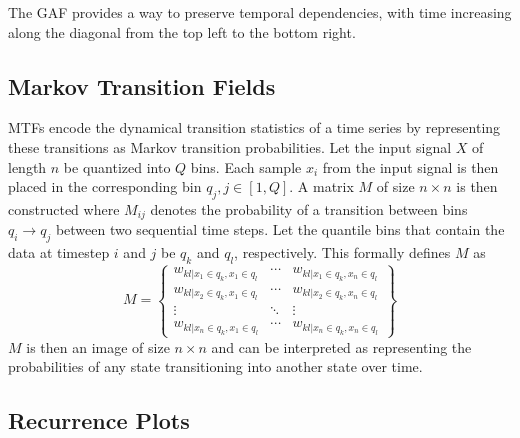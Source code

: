 The GAF provides a way to preserve temporal dependencies, with time increasing along the diagonal from the top left to the bottom right.

\subsection{Markov Transition Fields}

MTFs \cite{wang2015imaging} encode the dynamical transition statistics of a time series by representing these transitions as Markov transition probabilities.
Let the input signal $X$ of length $n$ be quantized into $Q$ bins.
Each sample $x_i$ from the input signal is then placed in the corresponding bin $q_j, j \in [1, Q]$.
A matrix $M$ of size $n \times n$ is then constructed where $M_{ij}$ denotes the probability of a transition between bins $q_i \rightarrow q_j$ between two sequential time steps. 
Let the quantile bins that contain the data at timestep $i$ and $j$ be $q_k$ and $q_l$, respectively.
This formally defines $M$ as
\begin{equation}
	M = \begin{Bmatrix}
			w_{kl|x_1 \in q_k, x_1 \in q_l} & \cdots & w_{kl|x_1 \in q_k, x_n \in q_l} \\
			w_{kl|x_2 \in q_k, x_1 \in q_l} & \cdots & w_{kl|x_2 \in q_k, x_n \in q_l} \\
			\vdots                          & \ddots & \vdots                          \\
			w_{kl|x_n \in q_k, x_1 \in q_l} & \cdots & w_{kl|x_n \in q_k, x_n \in q_l}
		\end{Bmatrix}
\end{equation}
$M$ is then an image of size $n \times n$ and can be interpreted as representing the probabilities of any state transitioning into another state over time.

\subsection{Recurrence Plots}

